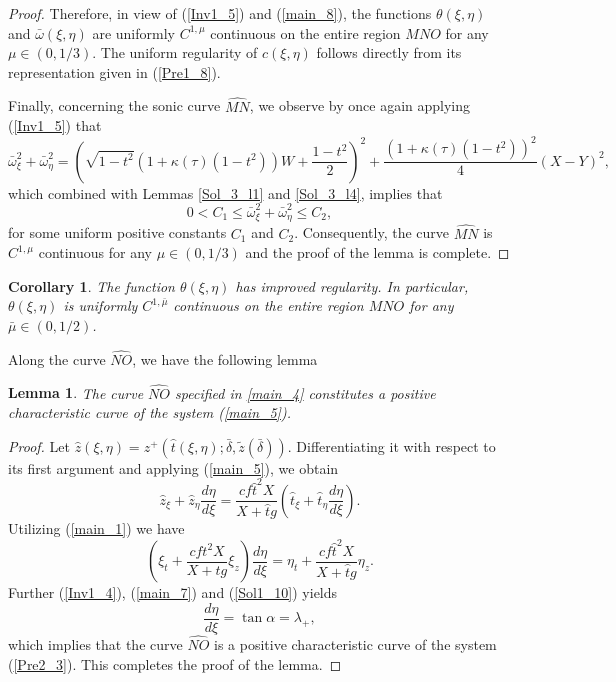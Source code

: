\documentclass[3p,11pt]{elsarticle}
\numberwithin{equation}{section}
\newtheorem{lemma}{Lemma}[section]
\newtheorem{corollary}{Corollary}[section]
\begin{document}
\begin{proof}
   Therefore, in view of (\ref{Inv1_5}) and (\ref{main_8}), the functions $\theta(\xi,\eta)$ and $\bar\omega(\xi,\eta)$ are uniformly $C^{1,\mu}$ continuous on the entire region $MNO$ for any $\mu\in(0,1/3)$. The uniform regularity of $c(\xi,\eta)$ follows directly from its representation given in (\ref{Pre1_8}).

   Finally, concerning the sonic curve $\widehat{MN}$, we observe by once again applying (\ref{Inv1_5}) that
   \begin{equation*}\label{main_13}
       \bar\omega_{\xi}^2+\bar\omega_{\eta}^2=\left(\sqrt{1-t^2}(1+\kappa(\tau)(1-t^2))W+\frac{1-t^2}{2} \right)^2+\frac{(1+\kappa(\tau)(1-t^2))^2}{4}( X- Y)^2,
   \end{equation*}
   which combined with Lemmas \ref{Sol_3_l1} and \ref{Sol_3_l4}, implies that
   \begin{equation*}\label{main_14}
       0<C_1\leq \bar\omega_{\xi}^2+\bar\omega_{\eta}^2\leq C_2,
   \end{equation*}
   for some uniform positive constants $C_{1}$ and $C_{2}$. Consequently, the curve $\widehat{MN}$ is $C^{1,\mu}$ continuous for any $\mu\in(0,1/3)$ and the proof of the lemma is complete.
\end{proof}
\begin{corollary}
    The function $\theta(\xi,\eta)$ has improved regularity. In particular, $\theta(\xi,\eta)$ is uniformly $C^{1,\bar\mu}$ continuous on the entire region $MNO$ for any $\bar\mu\in(0,1/2)$.
\end{corollary}
Along the curve $\widehat{NO}$, we have the following lemma
\begin{lemma}\label{Main_l2}
    The curve $\widehat{NO}$ specified in \eqref{main_4} constitutes a positive characteristic curve of the system (\ref{main_5}).
\end{lemma}
\begin{proof}
    Let $\hat z(\xi,\eta)=z^{+}(\hat t(\xi,\eta); \bar{\delta}, \tilde z(\bar{\delta}))$. Differentiating it with respect to its first argument and applying (\ref{main_5}), we obtain
    \begin{equation*}\label{main_15}
        \hat z_\xi+\hat z_\eta \frac{d\eta}{d\xi}=\frac{cf\hat{t}^2 X}{ X+\hat{t}g}\left( \hat t_\xi+\hat t_\eta \frac{d\eta}{d\xi}\right).
    \end{equation*}
    Utilizing (\ref{main_1}) we have
    \begin{equation*}\label{main_16}
        \left(\xi_t+\frac{cft^2 X}{ X+tg}\xi_z\right) \frac{d\eta}{d\xi}=\eta_t+\frac{cf\hat{t}^2 X}{ X+\hat{t}g}\eta_z.
    \end{equation*}
    Further (\ref{Inv1_4}), (\ref{main_7}) and (\ref{Sol1_10}) yields
    \begin{equation*}\label{main_17}
        \frac{d\eta}{d\xi}=\tan\alpha =\lambda_+,
    \end{equation*}
    which implies that the curve $\widehat{NO}$ is a positive characteristic curve of the system (\ref{Pre2_3}). This completes the proof of the lemma.
\end{proof}
\end{document}
